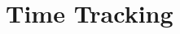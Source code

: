 
\appendix
	\renewcommand{\thepage}{\thechapter-\arabic{page}}



\chapter{Time Tracking}







\clearpage
